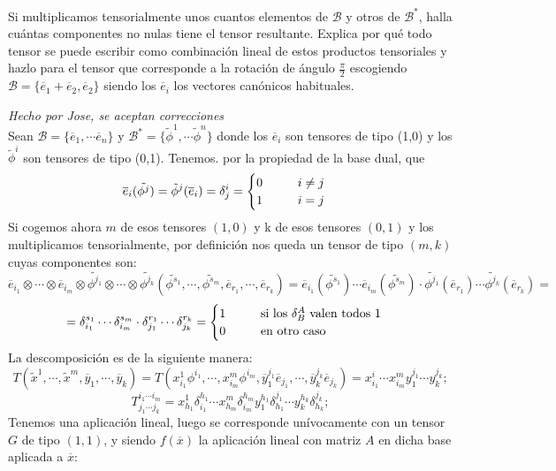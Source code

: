 \begin{problem}[4] \ppart Si multiplicamos tensorialmente unos cuantos elementos de $\mathcal{B}$ y otros de $\mathcal{B}^*$, halla cuántas componentes no nulas tiene el tensor resultante. Explica por qué todo tensor se puede escribir como combinación lineal de estos productos tensoriales y \ppart hazlo para el tensor que corresponde a la rotación de ángulo $\frac{\pi}{2}$ escogiendo $\mathcal{B}=\{\overline{e}_1+\overline{e}_2,\overline{e}_2\}$ siendo los $\overline{e}_i$ los vectores canónicos habituales.
	
	\solution \textit{Hecho por Jose, se aceptan correcciones}\\ \spart Sean $\mathcal{B}=\{\overline{e}_1,\cdots\overline{e}_n\}$ y $\mathcal{B}^*=\{\tilde{\phi}^1,\cdots\tilde{\phi}^n\}$ donde los $\overline{e}_i$ son tensores de tipo (1,0) y los $\tilde{\phi}^i$ son tensores de tipo (0,1). Tenemos. por la propiedad de la base dual, que $$\overline{e}_i(\tilde{\phi^{j}})=\tilde{\phi}^j(\overline{e}_i)=\delta^i_j=\begin{cases}0\hspace*{1cm} i\neq j\\1\hspace*{1cm} i=j
	\end{cases}$$ Si cogemos ahora $m$ de esos tensores $(1,0)$ y k de esos tensores $(0,1)$ y los multiplicamos tensorialmente, por definición nos queda un tensor de tipo $(m,k)$ cuyas componentes son:	$$\overline{e}_{i_1}\otimes\cdots\otimes\overline{e}_{i_m}\otimes\tilde{\phi^{j_1}}\otimes\cdots\otimes\tilde{\phi^{j_k}}(\tilde{\phi^{s_1}},\cdots,\tilde{\phi^{s_m}},\overline{e}_{r_1},\cdots,\overline{e}_{r_k})=\overline{e}_{i_1}(\tilde{\phi^{s_1}})\cdots\overline{e}_{i_m}(\tilde{\phi^{s_m}})\cdot\tilde{\phi^{j_1}}(\overline{e}_{r_1})\cdots\tilde{\phi^{j_k}}(\overline{e}_{r_k})=$$ $$=\delta_{i_1}^{s_1}\cdots\delta_{i_m}^{s_m}\cdot\delta_{j_1}^{r_1}\cdots\delta_{j_k}^{r_k}=\begin{cases}1\hspace*{1cm} \text{si los }\delta^A_B\text{ valen todos 1}\\0\hspace*{1cm} \text{en otro caso}
	\end{cases}$$
	La descomposición es de la siguiente manera:
	$$T(\tilde{x}^1,\cdots,\tilde{x}^m,\overline{y}_1,\cdots,\overline{y}_k)=T(x^1_{i_1}\phi^{i_1},\cdots,x^m_{i_m}\phi^{i_m},\overline{y}_1^{j_1}\overline{e}_{j_1},\cdots,\overline{y}_k^{j_k}\overline{e}_{j_k})=x^i_{i_1}\cdots x^m_{i_m}y_1^{j_1}\cdots y_k^{j_k};$$
	$$T^{i_1\cdots i_m}_{j_1\cdots j_k}=x^1_{h_1}\delta^{h_1}_{i_1}\cdots x^m_{h_m}\delta^{h_m}_{i_m}y_1^{h_1}\delta^{j_1}_{h_1}\cdots y_k^{h_k}\delta^{j_k}_{h_k};$$
	\spart Tenemos una aplicación lineal, luego se corresponde unívocamente con un tensor $G$ de tipo $(1,1)$, y siendo $f(\overline{x})$ la aplicación lineal con matriz $A$ en dicha base aplicada a $\overline{x}$:

\end{problem}
